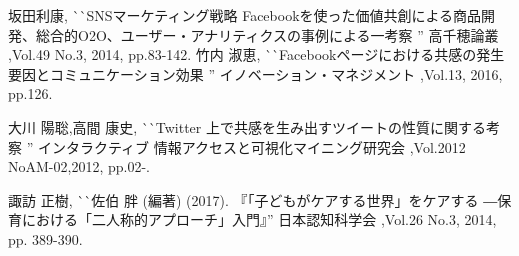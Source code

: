 \documentclass[dvipdfmx]{issj}
\begin{document}
\begin{thebibliography}{99}


   坂田利康, 
                       ^^ ^^ SNSマーケティング戦略 Facebookを使った価値共創による商品開発、総合的O2O、ユーザー・アナリティクスの事例による一考察 '' 
                       高千穂論叢 ,Vol.49 No.3, 2014, pp.83-142.
    竹内 淑恵, 
                       ^^ ^^ Facebookページにおける共感の発生要因とコミュニケーション効果 '' 
                       イノベーション・マネジメント ,Vol.13, 2016, pp.126.

    大川 陽聡,高間 康史, 
                       ^^ ^^ Twitter 上で共感を生み出すツイートの性質に関する考察 '' 
                       インタラクティブ 情報アクセスと可視化マイニング研究会 ,Vol.2012 NoAM-02,2012, pp.02-.



   諏訪 正樹,
                       ^^ ^^ 佐伯 胖 (編著) (2017). 『「子どもがケアする世界」をケアする ―保育における「二人称的アプローチ」入門』'' 
                       日本認知科学会 ,Vol.26 No.3, 2014, pp. 389-390.


\end{thebibliography}
\end{document}
